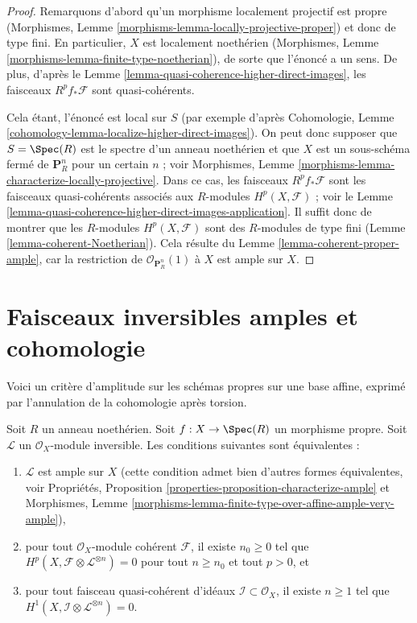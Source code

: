 \begin{proof}
Remarquons d'abord qu'un morphisme localement projectif est propre (Morphismes,
Lemme \ref{morphisms-lemma-locally-projective-proper}) et donc de type fini.
En particulier, $X$ est localement noethérien (Morphismes, Lemme
\ref{morphisms-lemma-finite-type-noetherian}), de sorte que l'énoncé a un sens.
De plus, d'après le Lemme
\ref{lemma-quasi-coherence-higher-direct-images}, les faisceaux
$R^pf_*\mathcal{F}$ sont quasi-cohérents.

\medskip\noindent
Cela étant, l'énoncé est local sur $S$ (par exemple d'après Cohomologie, Lemme
\ref{cohomology-lemma-localize-higher-direct-images}).
On peut donc supposer que $S = \Spec(R)$ est le spectre d'un anneau noethérien
et que $X$ est un sous-schéma fermé de $\mathbf{P}^n_R$ pour un certain $n$ ;
voir Morphismes, Lemme
\ref{morphisms-lemma-characterize-locally-projective}.
Dans ce cas, les faisceaux $R^pf_*\mathcal{F}$ sont les faisceaux
quasi-cohérents associés aux $R$-modules $H^p(X, \mathcal{F})$ ; voir le Lemme
\ref{lemma-quasi-coherence-higher-direct-images-application}.
Il suffit donc de montrer que les $R$-modules $H^p(X, \mathcal{F})$ sont des
$R$-modules de type fini (Lemme \ref{lemma-coherent-Noetherian}). Cela résulte du Lemme
\ref{lemma-coherent-proper-ample}, car la restriction de
$\mathcal{O}_{\mathbf{P}^n_R}(1)$ à $X$ est ample sur $X$.
\end{proof}
\section{Faisceaux inversibles amples et cohomologie}
\label{section-ample-cohomology}

\noindent
Voici un critère d'amplitude sur les schémas propres sur une base affine,
exprimé par l'annulation de la cohomologie après torsion.

\begin{lemma}
\label{lemma-vanshing-gives-ample}
\begin{reference}
\cite[III Proposition 2.6.1]{EGA}
\end{reference}
Soit $R$ un anneau noethérien. Soit $f : X \to \Spec(R)$ un morphisme propre.
Soit $\mathcal{L}$ un $\mathcal{O}_X$-module inversible.
Les conditions suivantes sont équivalentes :
\begin{enumerate}
\item $\mathcal{L}$ est ample sur $X$ (cette condition admet bien d'autres
formes équivalentes, voir
Propriétés, Proposition \ref{properties-proposition-characterize-ample} et
Morphismes, Lemme
\ref{morphisms-lemma-finite-type-over-affine-ample-very-ample}),
\item pour tout $\mathcal{O}_X$-module cohérent $\mathcal{F}$, il existe
$n_0 \geq 0$ tel que
$H^p(X, \mathcal{F} \otimes \mathcal{L}^{\otimes n}) = 0$ pour tout $n \geq n_0$
et tout $p > 0$, et
\item pour tout faisceau quasi-cohérent d'idéaux
$\mathcal{I} \subset \mathcal{O}_X$, il existe $n \geq 1$
tel que $H^1(X, \mathcal{I} \otimes \mathcal{L}^{\otimes n}) = 0$.
\end{enumerate}
\end{lemma}

